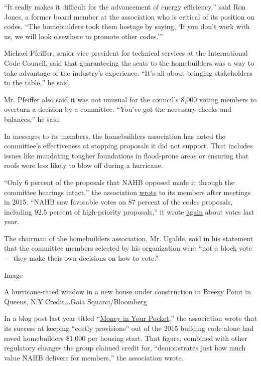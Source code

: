 ``It really makes it difficult for the advancement of energy
efficiency,'' said Ron Jones, a former board member at the association
who is critical of its position on codes. ``The homebuilders took them
hostage by saying, `If you don't work with us, we will look elsewhere to
promote other codes.'''

Michael Pfeiffer, senior vice president for technical services at the
International Code Council, said that guaranteeing the seats to the
homebuilders was a way to take advantage of the industry's experience.
``It's all about bringing stakeholders to the table,'' he said.

Mr. Pfeiffer also said it was not unusual for the council's 8,000 voting
members to overturn a decision by a committee. ``You've got the
necessary checks and balances,'' he said.

In messages to its members, the homebuilders association has noted the
committee's effectiveness at stopping proposals it did not support. That
includes issues like mandating tougher foundations in flood-prone areas
or ensuring that roofs were less likely to blow off during a hurricane.

``Only 6 percent of the proposals that NAHB opposed made it through the
committee hearings intact,'' the association
\href{http://nahbnow.com/2015/05/nahb-continues-fight-for-better-codes/}{wrote}
to its members after meetings in 2015. ``NAHB saw favorable votes on 87
percent of the codes proposals, including 92.5 percent of high-priority
proposals,'' it wrote
\href{http://nahbnow.com/2019/09/building-codes-vote-coming-soon-and-nahb-members-can-help/}{again}
about votes last year.

The chairman of the homebuilders association, Mr. Ugalde, said in his
statement that the committee members selected by his organization were
``not a block vote --- they make their own decisions on how to vote.''

Image

A hurricane-rated window in a new house under construction in Breezy
Point in Queens, N.Y.Credit...Gaia Squarci/Bloomberg

In a blog post last year titled
``\href{http://nahbnow.com/2018/02/nahb-advocacy-money-in-your-pocket/}{Money
in Your Pocket},'' the association wrote that its success at keeping
``costly provisions'' out of the 2015 building code alone had saved
homebuilders \$1,000 per housing start. That figure, combined with other
regulatory changes the group claimed credit for, ``demonstrates just how
much value NAHB delivers for members,'' the association wrote.

